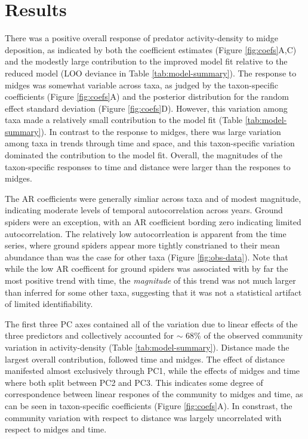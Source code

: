 

\section*{Results}

There was a positive overall response of predator activity-density to midge deposition,
as indicated by both the coefficient estimates (Figure \ref{fig:coefs}A,C)
and the modestly large contribution to the improved model fit
relative to the reduced model (LOO deviance in Table \ref{tab:model-summary}).
The response to midges was somewhat variable across taxa,
as judged by the taxon-specific coefficients (Figure \ref{fig:coefs}A)
and the posterior distribution
for the random effect standard deviation (Figure \ref{fig:coefs}D).
However, this variation among taxa made a relatively small contribution
to the model fit (Table \ref{tab:model-summary}).
In contrast to the response to midges,
there was large variation among taxa in trends through time and space,
and this taxon-specific variation dominated the contribution to the model fit.
Overall, the magnitudes of the taxon-specific responses to time and distance
were larger than the respones to midges.

The AR coefficients were generally simliar across taxa and of modest magnitude,
indicating moderate levels of temporal autocorrelation across years.
Ground spiders were an exception,
with an AR coefficient bording zero indicating limited autocorrelation.
The relatively low autocorrleation is apparent from the time series,
where ground spiders appear more tightly constrianed to their mean abundance
than was the case for other taxa (Figure \ref{fig:obs-data}).
Note that while the low AR coefficent for ground spiders was associated
with by far the most positive trend with time,
the \textit{magnitude} of this trend was not much larger than inferred for some other taxa,
suggesting that it was not a statistical artifact of limited identifiability.

The first three PC axes contained all of the variation
due to linear effects of the three predictors and
collectively accounted for $\sim$ 68\% of the observed community variation
in activity-density (Table \ref{tab:model-summary}).
Distance made the largest overall contribution,
followed time and midges.
The effect of distance manifested almost exclusively through PC1,
while the effects of midges and time where both split between PC2 and PC3.
This indicates some degree of correspondence between linear respones of the community
to midges and time, as can be seen in taxon-specific coefficients
(Figure \ref{fig:coefs}A).
In constrast, the community variation with respect to distance
was largely uncorrelated with respect to midges and time.

